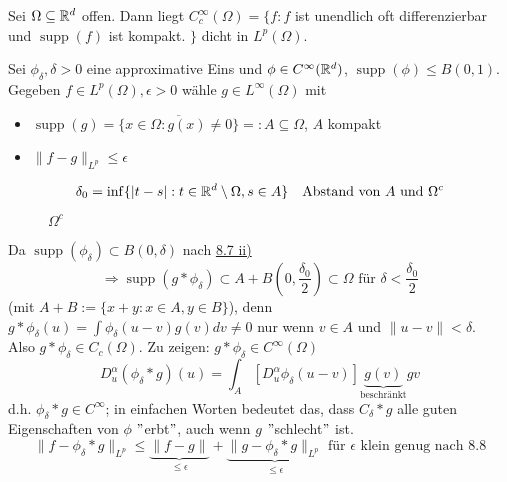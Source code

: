 \begin{kor} \label{kor:8.9}
	Sei $\Omega \subseteq \mathbb{R}^{d}$ offen. Dann liegt $C_{c}^{\infty}(\Omega) = \{ f : f $ ist unendlich oft differenzierbar und $\operatorname{supp}(f)$ ist kompakt. $\}$ dicht in $L^{p}(\Omega)$.
	\begin{beweis}
		Sei $\phi_{\delta}, \delta > 0$ eine approximative Eins und $\phi \in C^{\infty}(\mathbb{R}^{d})$, $\operatorname{supp}(\phi) \leq B(0, 1)$. \\
		Gegeben $f \in L^{p}(\Omega), \epsilon > 0$ wähle $g \in L^{\infty}(\Omega)$ mit
		\begin{itemize}
			\item $\operatorname{supp}(g) = \overline{\{ x \in \Omega: g(x) \neq 0 \}} =: A \subseteq \Omega$, $A$ kompakt
			\item $\| f - g \|_{L^{p}} \leq \epsilon$
		\end{itemize}
		\[ \delta_{0} = \inf \{ |t - s| : t \in \mathbb{R}^{d} \setminus \Omega, s \in A \} \quad \text{Abstand von } A \text{ und } \Omega^{c} \]

		\def\side{0.58}
		\begin{figure}[H]
			\centering		
			\hskip 0pt \parbox{4pt}{ $\Omega^{c}$ }
		\end{figure}
		
		Da $\operatorname{supp}(\phi_{\delta}) \subset B(0, \delta)$ nach \hyperref[bem:8.7ii]{8.7 ii)}
		\[ \Rightarrow \operatorname{supp}(g \ast \phi_{\delta} ) \subset A + B\left(0, \frac{\delta_{0}}{2}\right) \subset \Omega \text{ für } \delta < \frac{\delta_{0}}{2} \]
		(mit $A + B := \{ x + y : x \in A, y \in B\}$), denn $g \ast \phi_{\delta}(u) = \int \phi_{\delta}(u - v) g(v) dv \neq 0$ nur wenn $v \in A$ und $\| u - v \| < \delta$. \\
		Also $g \ast \phi_{\delta} \in C_{c}(\Omega)$. Zu zeigen: $g \ast \phi_{\delta} \in C^{\infty}(\Omega)$
		\[ D_{u}^{\alpha}(\phi_{\delta} \ast g)(u) = \int_{A} \left[ D_{u}^{\alpha} \phi_{\delta}(u - v) \right] \underbrace{g(v)}_{\text{beschränkt}} gv \]
		d.h. $\phi_{\delta} \ast g \in C	^{\infty}$; in einfachen Worten bedeutet das, dass $C_{\delta} \ast g$ alle guten Eigenschaften von $\phi$ $"$erbt$"$, auch wenn $g$ $"$schlecht$"$ ist. \\
		\[ \| f - \phi_{\delta} \ast g \|_{L^{p}} \leq \underbrace{\| f - g \|}_{\leq \epsilon} + \underbrace{\| g - \phi_{\delta} \ast g \|_{L^{p}}}_{\leq \epsilon} \text{ für } \epsilon \text{ klein genug nach } \hyperref[satz:8.8]{8.8} \]
	\end{beweis}
\end{kor}


